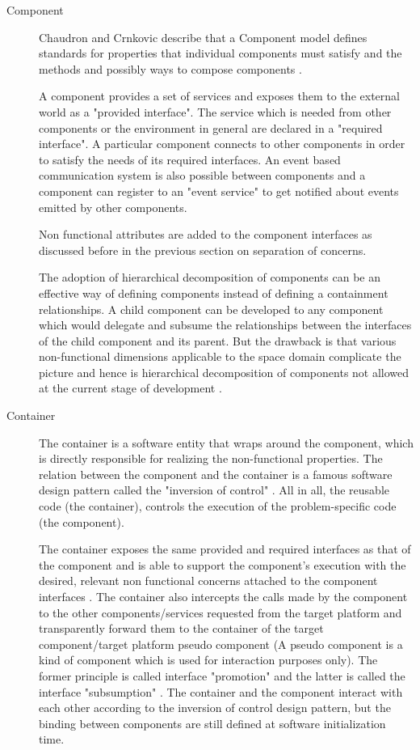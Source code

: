 \begin{description}
\item[Component] Chaudron and Crnkovic describe that a Component model defines standards for properties that individual components must satisfy and the methods and possibly ways to compose components \cite{CompBasedProcess}.

A component provides a set of services and exposes them to the external world as a "provided interface". The service which is needed from other components or the environment in general are declared in a "required interface". A particular component connects to other components in order to satisfy the needs of its required interfaces. An event based communication system is also possible between components and a component can register to an "event service" to get notified about events emitted by other components.

Non functional attributes are added to the component interfaces as discussed before in the previous section on separation of concerns.

The adoption of hierarchical decomposition of components can be an effective way of defining components instead of defining a containment relationships. A child component can be developed to any component which would delegate and subsume the relationships between the interfaces of the child component and its parent. But the drawback is that various non-functional dimensions applicable to the space domain complicate the picture and hence is hierarchical decomposition of components not allowed at the current stage of development \cite{PhdThesis}.
    
\item [Container] The container is a software entity that wraps around the component, which is directly responsible for realizing the non-functional properties. The relation between the component and the container is a famous software design pattern called the "inversion of control" \cite{CompBasedProcess}\cite{InvOfCntrlurl}. All in all, the reusable code (the container), controls the execution of the problem-specific code (the component).

The container exposes the same provided and required interfaces as that of the component and is able to support the component's execution with the desired, relevant non functional concerns attached to the component interfaces \cite{CompBasedDev}. The container also intercepts the calls made by the component to the other components/services requested from the target platform and transparently forward them to the container of the target component/target platform pseudo component (A pseudo component is a kind of component which is used for interaction purposes only). The former principle is called interface "promotion" and the latter is called the interface "subsumption" \cite{CompBasedDev}. The container and the component interact with each other according to the inversion of control design pattern, but the binding between components are still defined at software initialization time.


\end{description}
